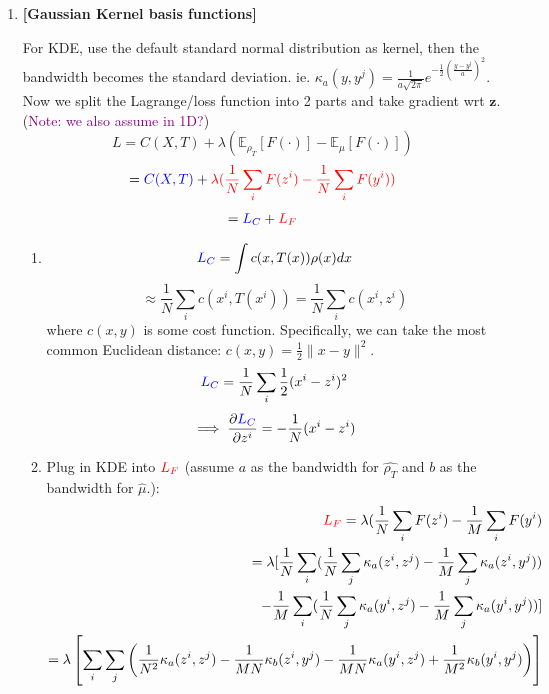 \documentclass[11pt]{article}
\begin{document}
\begin{enumerate}
    \item {\bf [Gaussian Kernel basis functions]}
    
    For KDE, use the default standard normal distribution as kernel, then the bandwidth becomes the standard deviation.
    ie. $\kappa_a(y,y^j) = \frac{1}{a \sqrt{2\pi}} e^{-\frac{1}{2}(\frac{y-y^j}{a})^2}$. Now we split the Lagrange/loss function into 2 parts and take gradient wrt $\mathbf{z}$. (\textcolor{purple}{Note: we also assume in 1D?})
    $$
    L = C(X,T) + \lambda (\mathbb{E}_{\rho_{T}} [F(\cdot)] - \mathbb{E}_{\mu} [F(\cdot)])
    $$
    $$
    = \textcolor{blue}{C(X,T)} + \textcolor{red}{\lambda (\frac{1}{N} \sum_i F(z^i) - \frac{1}{N} \sum_i F(y^i))}
    $$
    \begin{align}
        = \textcolor{blue}{L_C} + \textcolor{red}{L_F}
    \end{align}
    
    \begin{enumerate}
        \item 
        $$
        \textcolor{blue}{L_C} = \int c(x,T(x)) \rho(x) dx
        $$
        $$
        \approx \frac{1}{N} \sum_i c(x^i,T(x^i))
        = \frac{1}{N} \sum_i c(x^i,z^i)
        $$
        where $c(x,y)$ is some cost function. Specifically, we can take the most common Euclidean distance: $c(x,y) = \frac{1}{2} \|x-y\|^2$.
        $$
        \textcolor{blue}{L_C} = \frac{1}{N} \sum_i \frac{1}{2}(x^i-z^i)^2
        $$
        \begin{align*}
            \implies \frac{\partial \textcolor{blue}{L_C}}{\partial z^i}
            = - \frac{1}{N}(x^i-z^i)
        \end{align*}
        
        \item Plug in KDE into $\textcolor{red}{L_F}$ (assume $a$ as the bandwidth for $\hat{\rho_T}$ and $b$ as the bandwidth for $\hat{\mu}$.):
        \begin{align*}
            \textcolor{red}{L_F} = \lambda (\frac{1}{N} \sum_i F(z^i) - \frac{1}{M} \sum_i F(y^i)\\
            =  \lambda [\frac{1}{N} \sum_i (\frac{1}{N} \sum_j \kappa_a(z^i,z^j) - \frac{1}{M} \sum_j \kappa_a(z^i,y^j))\\
            - \frac{1}{M} \sum_i (\frac{1}{N} \sum_j \kappa_a(y^i,z^j) - \frac{1}{M} \sum_j \kappa_a(y^i,y^j))]\\
            = \lambda \left[\sum_i \sum_j \left( 
            \frac{1}{N^2}\kappa_a(z^i,z^j) -  \frac{1}{MN}\kappa_b(z^i,y^j) -   \frac{1}{MN}\kappa_a(y^i,z^j) +  \frac{1}{M^2}\kappa_b(y^i,y^j)
            \right) \right]
        \end{align*}
        

\end{enumerate}
\end{enumerate}
\end{document}
